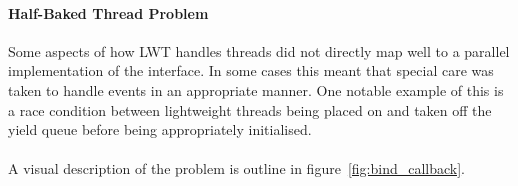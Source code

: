 \documentclass[12pt,twoside,notitlepage]{report}
\begin{document}
\paragraph{Half-Baked Thread Problem}
\label{para:half-baked_thread_problem}
%
%
Some aspects of how LWT handles threads did not directly map well to a parallel implementation of the interface. In some cases this meant that special care was taken to handle events in an appropriate manner. One notable example
of this is a race condition between lightweight threads being placed on and taken off the yield queue before being appropriately initialised.
\hfill\\
\hfill\\
A visual description of the problem is outline in figure~\ref{fig:bind_callback}.
\end{document}
